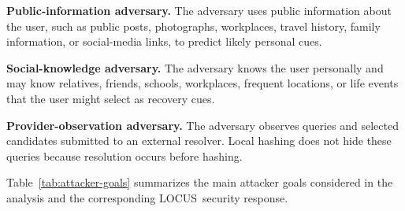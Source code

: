 \documentclass[sigconf,anonymous]{acmart}
\newcommand{\LOCUS}{\textsf{LOCUS}}
\begin{document}
\textbf{Public-information adversary.}
The adversary uses public information about the user, such as public posts, photographs, workplaces, travel history, family information, or social-media links, to predict likely personal cues.

\textbf{Social-knowledge adversary.}
The adversary knows the user personally and may know relatives, friends, schools, workplaces, frequent locations, or life events that the user might select as recovery cues.

\textbf{Provider-observation adversary.}
The adversary observes queries and selected candidates submitted to an external resolver. Local hashing does not hide these queries because resolution occurs before hashing.

Table~\ref{tab:attacker-goals} summarizes the main attacker goals considered in the analysis and the corresponding \LOCUS\ security response.
\end{document}
